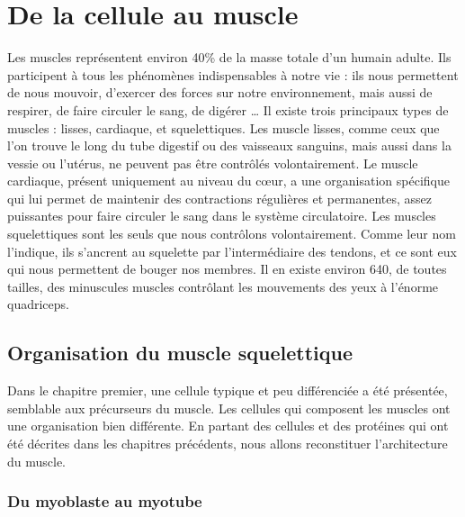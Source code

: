 \documentclass{report}
\begin{document}
\chapter{De la cellule au muscle}

Les muscles représentent environ 40\% de la masse totale d'un humain adulte. Ils participent à tous les phénomènes indispensables à notre vie : ils nous permettent de nous mouvoir, d'exercer des forces sur notre environnement, mais aussi de respirer, de faire circuler le sang, de digérer \dots 
Il existe trois principaux types de muscles : lisses, cardiaque, et squelettiques. Les muscle lisses, comme ceux que l'on trouve le long du tube digestif ou des vaisseaux sanguins, mais aussi dans la vessie ou l'utérus, ne peuvent pas être contrôlés volontairement. 
Le muscle cardiaque, présent uniquement au niveau du c\oe ur, a une organisation spécifique qui lui permet de maintenir des contractions régulières et permanentes, assez puissantes pour faire circuler le sang dans le système circulatoire. 
Les muscles squelettiques sont les seuls que nous contrôlons volontairement. Comme leur nom l'indique, ils s'ancrent au squelette par l'intermédiaire des tendons, et ce sont eux qui nous permettent de bouger nos membres.  
Il en existe environ 640, de toutes tailles, des minuscules muscles contrôlant les mouvements des yeux à l'énorme quadriceps.

\section{Organisation du muscle squelettique}

Dans le chapitre premier, une cellule typique et peu différenciée a été présentée, semblable aux précurseurs du muscle. Les cellules qui composent les muscles ont une organisation bien différente. 
En partant des cellules et des protéines qui ont été décrites dans les chapitres précédents, nous allons reconstituer l'architecture du muscle. 

\subsection{Du myoblaste au myotube}
\end{document}
